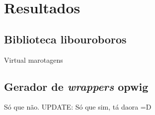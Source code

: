 \chapter{Resultados}
\label{sec:resultados}


\section{Biblioteca \textbf{libouroboros}}
Virtual marotagens

\section{Gerador de \emph{wrappers} \textbf{opwig}}

Só que não. 
UPDATE: Só que sim, tá daora =D
